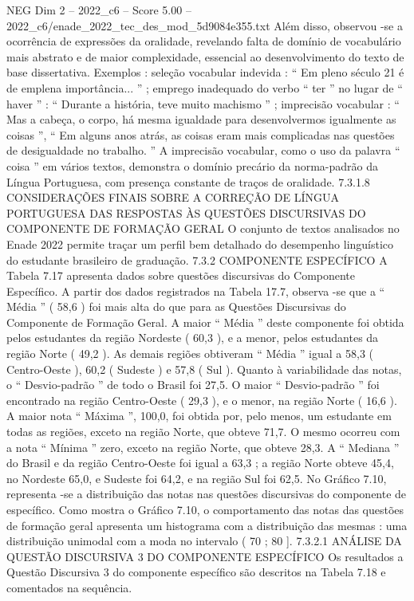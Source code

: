 \begin{textsample}{NEG Dim 2 – 2022\_c6 – Score 5.00 – 2022\_c6/enade\_2022\_tec\_des\_mod\_5d9084e355.txt}
Além disso, observou -se a ocorrência de expressões da oralidade, revelando falta de domínio de vocabulário mais abstrato e de maior complexidade, essencial ao desenvolvimento do texto de base dissertativa.
Exemplos : seleção vocabular indevida : “ Em pleno século 21 é de emplena importância... ” ; emprego inadequado do verbo “ ter ” no lugar de “ haver ” : “ Durante a história, teve muito machismo ” ; imprecisão vocabular : “ Mas a cabeça, o corpo, há mesma igualdade para desenvolvermos igualmente as coisas ”, “ Em alguns anos atrás, as coisas eram mais complicadas nas questões de desigualdade no trabalho. ” A imprecisão vocabular, como o uso da palavra “ coisa ” em vários textos, demonstra o domínio precário da norma-padrão da Língua Portuguesa, com presença constante de traços de oralidade. 7.3.1.8 CONSIDERAÇÕES FINAIS SOBRE A CORREÇÃO DE LÍNGUA PORTUGUESA DAS RESPOSTAS ÀS QUESTÕES DISCURSIVAS DO COMPONENTE DE FORMAÇÃO GERAL O conjunto de textos analisados no Enade 2022 permite traçar um perfil bem detalhado do desempenho linguístico do estudante brasileiro de graduação. 7.3.2 COMPONENTE ESPECÍFICO A Tabela 7.17 apresenta dados sobre questões discursivas do Componente Específico.
A partir dos dados registrados na Tabela 17.7, observa -se que a “ Média ” ( 58,6 ) foi mais alta do que para as Questões Discursivas do Componente de Formação Geral.
A maior “ Média ” deste componente foi obtida pelos estudantes da região Nordeste ( 60,3 ), e a menor, pelos estudantes da região Norte ( 49,2 ).
As demais regiões obtiveram “ Média ” igual a 58,3 ( Centro-Oeste ), 60,2 ( Sudeste ) e 57,8 ( Sul ).
Quanto à variabilidade das notas, o “ Desvio-padrão ” de todo o Brasil foi 27,5.
O maior “ Desvio-padrão ” foi encontrado na região Centro-Oeste ( 29,3 ), e o menor, na região Norte ( 16,6 ).
A maior nota “ Máxima ”, 100,0, foi obtida por, pelo menos, um estudante em todas as regiões, exceto na região Norte, que obteve 71,7.
O mesmo ocorreu com a nota “ Mínima ” zero, exceto na região Norte, que obteve 28,3.
A “ Mediana ” do Brasil e da região Centro-Oeste foi igual a 63,3 ; a região Norte obteve 45,4, no Nordeste 65,0, e Sudeste foi 64,2, e na região Sul foi 62,5.
No Gráfico 7.10, representa -se a distribuição das notas nas questões discursivas do componente de específico.
Como mostra o Gráfico 7.10, o comportamento das notas das questões de formação geral apresenta um histograma com a distribuição das mesmas : uma distribuição unimodal com a moda no intervalo ( 70 ; 80 ]. 7.3.2.1 ANÁLISE DA QUESTÃO DISCURSIVA 3 DO COMPONENTE ESPECÍFICO Os resultados a Questão Discursiva 3 do componente específico são descritos na Tabela 7.18 e comentados na sequência.

\end{textsample}
